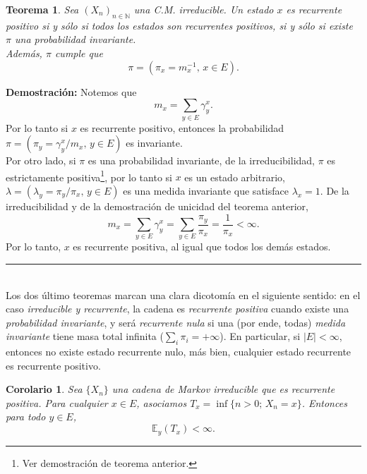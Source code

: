 \documentclass[a4paper]{article}
\newtheorem{teorema}{Teorema}
\newtheorem{cor}{Corolario}
\numberwithin{equation}{subsection}
\def\N{\mathbb N}
\def\E{\mathbb E}
\begin{document}
\begin{teorema}
Sea $(X_n)_{n\in \N}$ una C.M. irreducible. Un estado $x$ es recurrente positivo si y sólo si todos los estados son recurrentes positivos, si y sólo si existe $\pi$ una probabilidad invariante.\\ \newline
Además, $\pi$ cumple que
\[\pi = (\pi_x = m_x^{-1},\,x\in E).\]
\end{teorema}

\textbf{Demostración: }Notemos que
\[m_x = \sum_{y\in E}\gamma_y^x.\]
Por lo tanto si $x$ es recurrente positivo, entonces la probabilidad $\pi = (\pi_y = \gamma_y^x/m_x,\,y\in E)$ es invariante.\\ 

Por otro lado, si $\pi$ es una probabilidad invariante, de la irreducibilidad, $\pi$ es estrictamente positiva\footnote{Ver demostración de teorema anterior.}, por lo tanto si $x$ es un estado arbitrario, $\lambda = (\lambda_y = \pi_y / \pi_x,\, y \in E)$ es una medida invariante que satisface $\lambda_x =1$. De la irreducibilidad y de la demostración de unicidad del teorema anterior,
\[m_x = \sum_{y\in E}\gamma_y^x = \sum_{y\in E}\frac{\pi_y}{\pi_x} = \frac{1}{\pi_x} <\infty.\]
Por lo tanto, $x$ es recurrente positiva, al igual que todos los demás estados.\\
\rule{0.7em}{0.7em}\\ \newline
Los dos último teoremas marcan una clara dicotomía en el siguiente sentido: en el caso \textit{irreducible y recurrente}, la cadena es \textit{recurrente positiva} cuando existe una \textit{probabilidad invariante}, y será \textit{recurrente nula} si una (por ende, todas) \textit{medida invariante} tiene masa total infinita ($\sum_i \pi_i = +\infty$). En particular, si $|E|<\infty$, entonces no existe estado recurrente nulo, más bien, cualquier estado recurrente es recurrente positivo.

\begin{cor}
Sea $\{X_n\}$ una cadena de Markov irreducible que es recurrente positiva. Para cualquier $x \in E$, asociamos $T_x =\inf\{n>0;\,X_n=x\}$. Entonces para todo $y\in E$,
\[\E_y(T_x) < \infty.\]
\end{cor}
\end{document}
